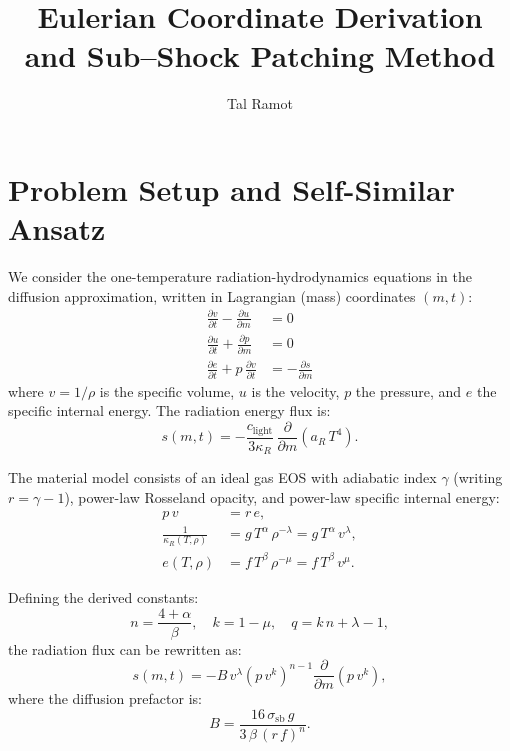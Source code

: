 \documentclass[11pt]{article}
\title{Eulerian Coordinate Derivation \\ and Sub--Shock Patching Method}
\author{Tal Ramot}
\date{}
\begin{document}
\maketitle

\tableofcontents
\newpage

\section{Problem Setup and Self-Similar Ansatz}

We consider the one-temperature radiation-hydrodynamics equations in the diffusion approximation, written in Lagrangian (mass) coordinates $(m,t)$:
\begin{align}
  \frac{\partial v}{\partial t} - \frac{\partial u}{\partial m} &= 0 \label{eq:cont}\\[4pt]
  \frac{\partial u}{\partial t} + \frac{\partial p}{\partial m} &= 0 \label{eq:mom}\\[4pt]
  \frac{\partial e}{\partial t} + p\,\frac{\partial v}{\partial t}
      &= -\frac{\partial s}{\partial m} \label{eq:energy}
\end{align}
where $v = 1/\rho$ is the specific volume, $u$ is the velocity, $p$ the pressure, and $e$ the specific internal energy. The radiation energy flux is:
\begin{equation}
  s(m,t) = -\frac{c_{\mathrm{light}}}{3\kappa_R}\,
            \frac{\partial}{\partial m}\!\left(a_R\,T^4\right).
\end{equation}

The material model consists of an ideal gas EOS with adiabatic index $\gamma$ (writing $r = \gamma - 1$), power-law Rosseland opacity, and power-law specific internal energy:
\begin{align}
  p\,v &= r\,e, \label{eq:eos}\\[2pt]
  \frac{1}{\kappa_R(T,\rho)} &= g\,T^{\alpha}\,\rho^{-\lambda}
       = g\,T^{\alpha}\,v^{\lambda}, \\[2pt]
  e(T,\rho) &= f\,T^{\beta}\,\rho^{-\mu}
       = f\,T^{\beta}\,v^{\mu}.
\end{align}

Defining the derived constants:
\begin{equation}
  n = \frac{4+\alpha}{\beta}, \quad
  k = 1 - \mu, \quad
  q = k\,n + \lambda - 1,
\end{equation}
the radiation flux can be rewritten as:
\begin{equation}
  s(m,t) = -B\,v^{\lambda}\!\left(p\,v^{k}\right)^{n-1}
            \frac{\partial}{\partial m}\!\left(p\,v^{k}\right),
\end{equation}
where the diffusion prefactor is:
\begin{equation}
  B = \frac{16\,\sigma_{\mathrm{sb}}\,g}
           {3\,\beta\,(r\,f)^{n}}.
\end{equation}
\end{document}
